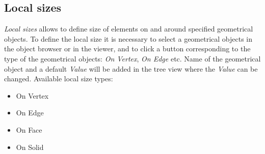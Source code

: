 \documentclass{article}
\begin{document}
\subsection{Local sizes}
\textit{Local sizes} allows to define size of elements on and around specified geometrical objects. To define the local size it is necessary to select a geometrical objects in the object browser or in the viewer, and to click a button corresponding to the type of the geometrical objects: \textit{On Vertex}, \textit{On Edge} etc. Name of the geometrical object and a default \textit{Value} will be added in the tree view where the \textit{Value} can be changed. Available local size types:
\begin{itemize}
    \item On Vertex
    \item On Edge
    \item On Face
    \item On Solid
\end{itemize}
\newpage
\end{document}
